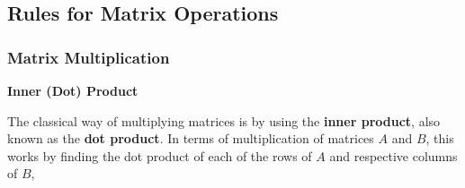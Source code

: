     \subsection{Rules for Matrix Operations}

        \subsubsection{Matrix Multiplication}

            \textbf{Inner (Dot) Product}
            \par \hfill \break
            The classical way of multiplying matrices is by using the \textbf{inner product}, also known as the
            \textbf{dot product}. In terms of multiplication of matrices \(A\) and \(B\), this works by finding the dot
            product of each of the rows of \(A\) and respective columns of \(B\),
            
